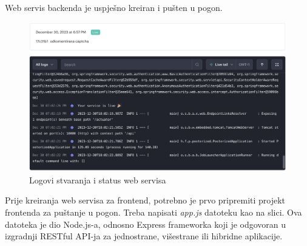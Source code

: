 \begin{enumerate}
			Web servis backenda je uspješno kreiran i pušten u pogon.
			\begin{figure}[H]
				\includegraphics[scale=0.4]{slike/deploy/backend6.png} %
				\centering
				\caption{Logovi stvaranja i status web servisa}
				\label{fig:promjene}
			\end{figure}
			
			\pagebreak
			Prije kreiranja web servisa za frontend, potrebno je prvo pripremiti projekt frontenda za puštanje u pogon.
			Treba napisati \textit{app.js} datoteku kao na slici. Ova datoteka je dio Node.js-a, odnosno Express frameworka koji je odgovoran u izgradnji RESTful API-ja za jednostrane, višestrane ili hibridne aplikacije.
			

\end{enumerate}
